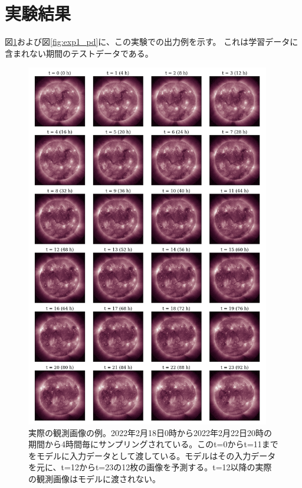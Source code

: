   \section{実験結果}
    図\ref{fig:exp1_gt}および図\ref{fig:exp1_pd}に、この実験での出力例を示す。
    これは学習データに含まれない期間のテストデータである。
    \begin{figure}[htpb]
      \centering
      \vspace*{-2cm} %
      \includegraphics[width=0.95\textwidth]{figures/exp1/gt.png}
      \caption{実際の観測画像の例。2022年2月18日0時から2022年2月22日20時の期間から4時間毎にサンプリングされている。このt=0からt=11までをモデルに入力データとして渡している。モデルはその入力データを元に、t=12からt=23の12枚の画像を予測する。t=12以降の実際の観測画像はモデルに渡されない。}
      \vspace{-1cm} %
      \label{fig:exp1_gt}
    \end{figure}
